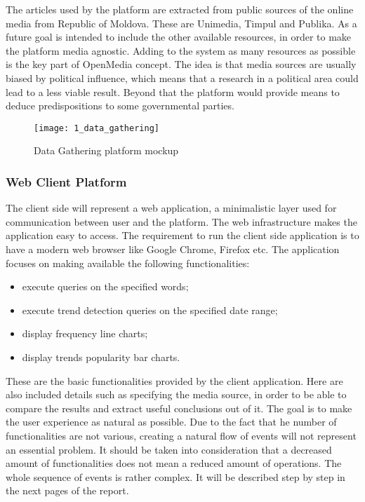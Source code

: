 The articles used by the platform are extracted from public sources of the online media from Republic of Moldova. These are Unimedia, Timpul and Publika. As a future goal is intended to include the other available resources, in order to make the platform media agnostic. Adding to the system as many resources as possible is the key part of OpenMedia concept. The idea is that media sources are usually biased by political influence, which means that a research in a political area could lead to a less viable result. Beyond that the platform would provide means to deduce predispositions to some governmental parties.

\begin{figure}[!ht]
\centering
\texttt{[image: 1\_data\_gathering]}
\caption{Data Gathering platform mockup}\label{data_gathering_mock}
\end{figure}

\subsubsection{Web Client Platform}
The client side will represent a web application, a minimalistic layer used for communication between user and the platform. The web infrastructure makes the application easy to access. The requirement to run the client side application is to have a modern web browser like Google Chrome, Firefox etc. The application focuses on making available the following functionalities:
\begin{itemize}
    \item execute queries on the specified words;
    \item execute trend detection queries on the specified date range;
    \item display frequency line charts;
    \item display trends popularity bar charts.
\end{itemize}

These are the basic functionalities provided by the client application. Here are also included details such as specifying the media source, in order to be able to compare the results and extract useful conclusions out of it. The goal is to make the user experience as natural as possible. Due to the fact that he number of functionalities are not various, creating a natural flow of events will not represent an essential problem. It should be taken into consideration that a decreased amount of functionalities does not mean a reduced amount of operations. The whole sequence of events is rather complex. It will be described step by step in the next pages of the report.


